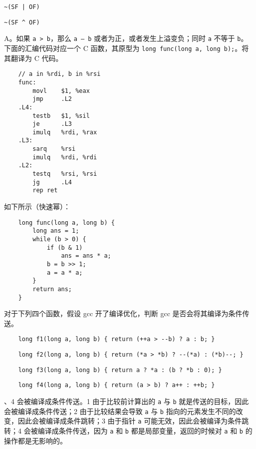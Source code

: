 \begin{problems}
\begin{choices}
            \item \verb+~(SF | OF)+
            \item \verb+~(SF ^ OF)+
        \end{choices}
        \sol A。如果 \verb|a > b|，那么 \verb|a – b| 或者为正，或者发生上溢变负；同时 \verb|a| 不等于 \verb|b|。
        \pro 下面的汇编代码对应一个 C 函数，其原型为 \verb|long func(long a, long b);|。将其翻译为 C 代码。
        \begin{verbatim}
    // a in %rdi, b in %rsi
    func: 
        movl    $1, %eax
        jmp     .L2
    .L4: 
        testb   $1, %sil
        je      .L3
        imulq   %rdi, %rax
    .L3: 
        sarq    %rsi
        imulq   %rdi, %rdi
    .L2: 
        testq   %rsi, %rsi
        jg      .L4
        rep ret 
        \end{verbatim}
        \sol 如下所示（快速幂）：
        \begin{verbatim}
    long func(long a, long b) {
        long ans = 1;
        while (b > 0) {
            if (b & 1)
                ans = ans * a;
            b = b >> 1;
            a = a * a;
        }
        return ans;
    }
        \end{verbatim}
        \pro 对于下列四个函数，假设 gcc 开了编译优化，判断 gcc 是否会将其编译为条件传送。
        \qn
        \begin{verbatim}
    long f1(long a, long b) { return (++a > --b) ? a : b; }
        \end{verbatim}
        \qn
        \begin{verbatim}
    long f2(long a, long b) { return (*a > *b) ? --(*a) : (*b)--; }
        \end{verbatim}
        \qn
        \begin{verbatim}
    long f3(long a, long b) { return a ? *a : (b ? *b : 0); }
        \end{verbatim}
        \qn
        \begin{verbatim}
    long f4(long a, long b) { return (a > b) ? a++ : ++b; }
        \end{verbatim}
        、4 会被编译成条件传送。1 由于比较前计算出的 \verb|a| 与 \verb|b| 就是传送的目标，因此会被编译成条件传送；2 由于比较结果会导致 \verb|a| 与 \verb|b| 指向的元素发生不同的改变，因此会被编译成条件跳转；3 由于指针 \verb|a| 可能无效，因此会被编译为条件跳转；4 会被编译成条件传送，因为 \verb|a| 和 \verb|b| 都是局部变量，返回的时候对 \verb|a| 和 \verb|b| 的操作都是无影响的。

\end{problems}
